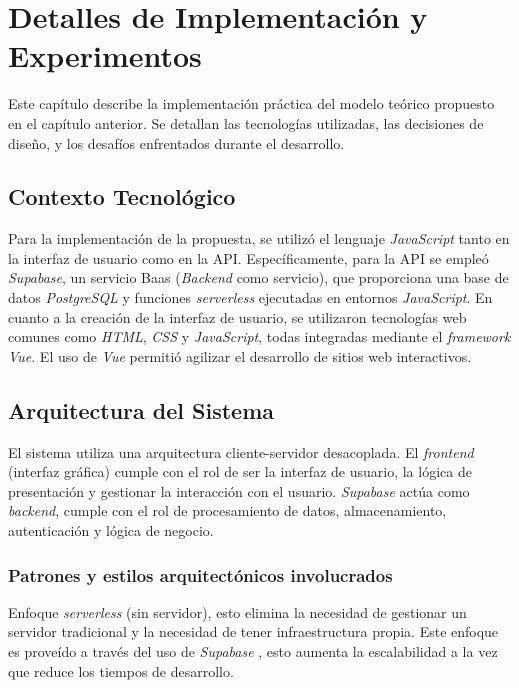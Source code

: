 \chapter{Detalles de Implementación y Experimentos}\label{chapter:implementation}
Este capítulo describe la implementación práctica del modelo teórico propuesto en el capítulo anterior. Se detallan las tecnologías utilizadas, las decisiones de diseño, y los desafíos enfrentados durante el desarrollo.


\section{Contexto Tecnol\'ogico}
Para la implementación de la propuesta, se utilizó el lenguaje \textit{JavaScript} tanto en la interfaz de usuario como en la API. Específicamente, para la API se empleó \textit{Supabase}, un servicio Baas (\textit{Backend} como servicio), que proporciona una base de datos \textit{PostgreSQL} y funciones \textit{serverless} ejecutadas en entornos \textit{JavaScript}. En cuanto a la creación de la interfaz de usuario, se utilizaron tecnologías web comunes como \textit{HTML}, \textit{CSS} y \textit{JavaScript}, todas integradas mediante el \textit{framework} \textit{Vue}. El uso de \textit{Vue} permitió agilizar el desarrollo de sitios web interactivos. 

\section{Arquitectura del Sistema}
El sistema utiliza una arquitectura cliente-servidor desacoplada. El \textit{frontend} (interfaz gr\'afica) cumple con el rol de ser la interfaz de usuario, la l\'ogica de presentaci\'on y gestionar la interacci\'on con el usuario. \textit{Supabase} \cite{supabase} act\'ua como \textit{backend}, cumple con el rol de procesamiento de datos, almacenamiento, autenticaci\'on y l\'ogica de negocio.

\subsection{Patrones y estilos arquitect\'onicos involucrados}
Enfoque \textit{serverless} (sin servidor), esto elimina la necesidad de gestionar un servidor tradicional y la necesidad de tener infraestructura propia. Este enfoque es prove\'ido a trav\'es del uso de \textit{Supabase} \cite{supabase}, esto aumenta la escalabilidad a la vez que reduce los tiempos de desarrollo.

